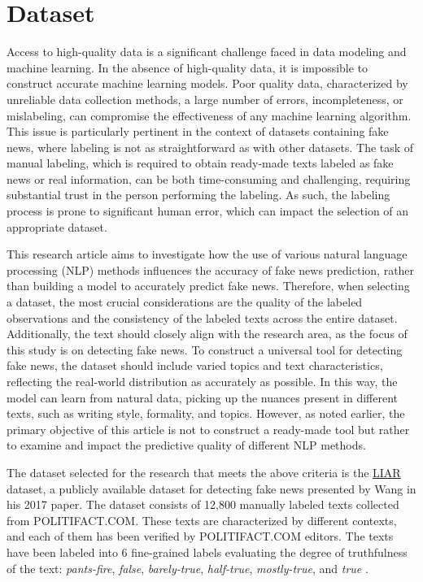 \section{Dataset}

Access to high-quality data is a significant challenge faced in data modeling and machine learning. In the absence of high-quality data, it is impossible to construct accurate machine learning models. Poor quality data, characterized by unreliable data collection methods, a large number of errors, incompleteness, or mislabeling, can compromise the effectiveness of any machine learning algorithm. This issue is particularly pertinent in the context of datasets containing fake news, where labeling is not as straightforward as with other datasets. The task of manual labeling, which is required to obtain ready-made texts labeled as fake news or real information, can be both time-consuming and challenging, requiring substantial trust in the person performing the labeling. As such, the labeling process is prone to significant human error, which can impact the selection of an appropriate dataset.

This research article aims to investigate how the use of various natural language processing (NLP) methods influences the accuracy of fake news prediction, rather than building a model to accurately predict fake news. Therefore, when selecting a dataset, the most crucial considerations are the quality of the labeled observations and the consistency of the labeled texts across the entire dataset. Additionally, the text should closely align with the research area, as the focus of this study is on detecting fake news. To construct a universal tool for detecting fake news, the dataset should include varied topics and text characteristics, reflecting the real-world distribution as accurately as possible. In this way, the model can learn from natural data, picking up the nuances present in different texts, such as writing style, formality, and topics. However, as noted earlier, the primary objective of this article is not to construct a ready-made tool but rather to examine and impact the predictive quality of different NLP methods. 

The dataset selected for the research that meets the above criteria is the \href{https://huggingface.co/datasets/liar}{LIAR} dataset, a publicly available dataset for detecting fake news presented by Wang in his 2017 paper. The dataset consists of 12,800 manually labeled texts collected from POLITIFACT.COM. These texts are characterized by different contexts, and each of them has been verified by POLITIFACT.COM editors. The texts have been labeled into 6 fine-grained labels evaluating the degree of truthfulness of the text: \textit{pants-fire}, \textit{false}, \textit{barely-true}, \textit{half-true}, \textit{mostly-true}, and \textit{true} \autocite{wang-2017-liar}.


